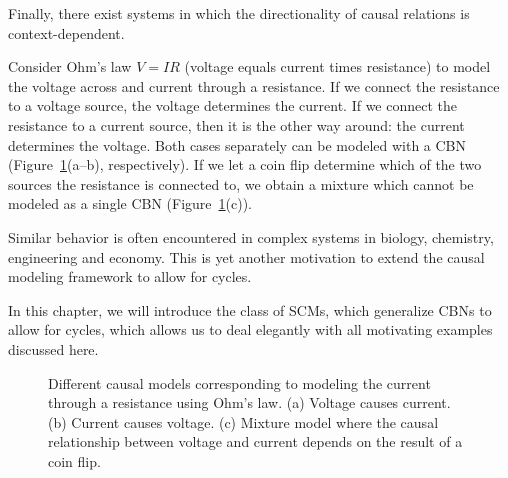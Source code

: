 Finally, there exist systems in which the directionality of causal relations is context-dependent.
\begin{Eg}
Consider Ohm's law $V = I R$ (voltage equals current times resistance) to model the voltage across and current through a resistance.
If we connect the resistance to a voltage source, the voltage determines the current.
If we connect the resistance to a current source, then it is the other way around: the current determines the voltage.
Both cases separately can be modeled with a CBN (Figure~\ref{fig:context_specific_causality}(a--b), respectively).
If we let a coin flip determine which of the two sources the resistance is connected to, we obtain a mixture which cannot be modeled as a single CBN (Figure~\ref{fig:context_specific_causality}(c)).
\end{Eg}
Similar behavior is often encountered in complex systems in biology, chemistry, engineering and economy.
This is yet another motivation to extend the causal modeling framework to allow for cycles.

In this chapter, we will introduce the class of SCMs, which generalize CBNs to allow for cycles, which allows us to deal elegantly with all motivating examples discussed here.

\begin{figure}[tb]
\centering
{}
  \caption{Different causal models corresponding to modeling the current through a resistance using Ohm's law. (a) Voltage causes current. (b) Current causes voltage. (c) Mixture model where the causal relationship between voltage and current depends on the result of a coin flip.}
\label{fig:context_specific_causality}
\end{figure}


